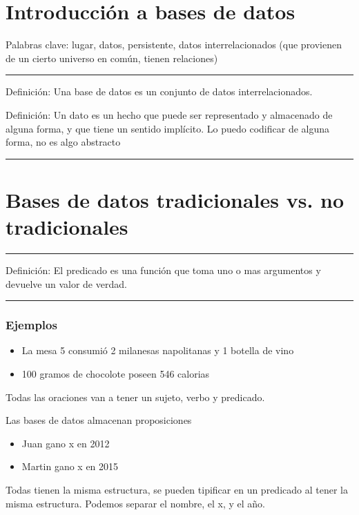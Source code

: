 \section{Introducción a bases de datos}

Palabras clave: lugar, datos, persistente, datos interrelacionados (que provienen de un cierto universo en común, tienen relaciones)

\noindent\rule{\textwidth}{0.5pt}

Definición: Una base de datos es un conjunto de datos interrelacionados.

\medskip

Definición: Un dato es un hecho que puede ser representado y almacenado de alguna forma, y que tiene un sentido implícito. 
Lo puedo codificar de alguna forma, no es algo abstracto

\noindent\rule{\textwidth}{0.5pt}


\section{Bases de datos tradicionales vs. no tradicionales}

\noindent\rule{\textwidth}{0.5pt}

Definición: El predicado es una función que toma uno o mas argumentos y devuelve un valor de verdad.

\noindent\rule{\textwidth}{0.5pt}

\subsubsection*{Ejemplos}
\begin{itemize}
\item La mesa 5 consumió 2 milanesas napolitanas y 1 botella de vino
\item 100 gramos de chocolote poseen 546 calorias
\end{itemize}

\smallskip

Todas las oraciones van a tener un sujeto, verbo y predicado.

\smallskip

Las bases de datos almacenan proposiciones
\begin{itemize}
\item Juan gano x en 2012
\item Martin gano x en 2015
\end{itemize}

Todas tienen la misma estructura, se pueden tipificar en un predicado al tener la misma estructura. Podemos separar el nombre, el x, y el año.

